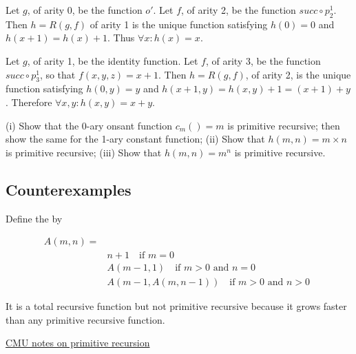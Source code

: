   Let $g$, of arity 0, be the function $o'$. Let $f$, of arity 2, be the function $succ \circ p^1_2$.  Then $h = R(g,f)$ of arity 1 is the unique function satisfying $h(0) = 0$ and $h(x+1) = h(x) + 1$.  Thus $\forall x: h(x) = x$.

 Let $g$, of arity 1,  be the identity function.   Let $f$, of arity 3, be the function $succ \circ p^1_3$, so that $f(x,y,z) = x + 1$.  Then $h = R(g,f)$, of arity 2, is the unique function satisfying $h(0,y) = y$ and $h(x+1,y) = h(x,y) + 1 = (x+1) + y$.  Therefore $\forall x,y: h(x,y) = x + y$.

 (i) Show that the 0-ary onsant function $c_m() = m$ is primitive recursive; then show the same for the 1-ary constant function; (ii) Show that $h(m,n) = m\times n$ is primitive recursive; (iii) Show that $h(m,n) = m^n$ is primitive recursive.


\subsection{Counterexamples}

Define the  by


\begin{align}
A(m,n)  =& \\
               & n+ 1 \quad  \text{if $m = 0$} \\
              & A(m-1,1)  \quad \text{if $m > 0$ and $n = 0$} \\
              & A(m-1,A(m,n-1)) \quad \text{if $m > 0$ and $n > 0$} \ \
\end{align}

It is a total recursive function but not primitive recursive because it grows faster than any primitive recursive function.


\href{https://www.andrew.cmu.edu/user/kk3n/complearn/chapter2.pdf}{CMU notes on primitive recursion}
